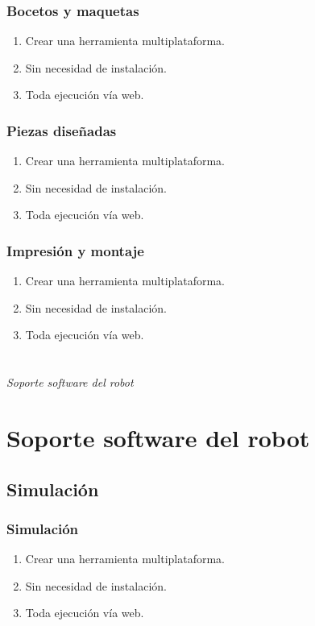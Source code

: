 \documentclass{beamer}
\begin{document}
\begin{frame}
	\frametitle{Bocetos y maquetas}
	\begin{enumerate}
		\item Crear una herramienta multiplataforma.
		\item Sin necesidad de instalación.
		\item Toda ejecución vía web.
	\end{enumerate}
\end{frame}

\begin{frame}
	\frametitle{Piezas diseñadas}
	\begin{enumerate}
		\item Crear una herramienta multiplataforma.
		\item Sin necesidad de instalación.
		\item Toda ejecución vía web.
	\end{enumerate}
\end{frame}

\begin{frame}
	\frametitle{Impresión y montaje}
	\begin{enumerate}
		\item Crear una herramienta multiplataforma.
		\item Sin necesidad de instalación.
		\item Toda ejecución vía web.
	\end{enumerate}
\end{frame}



\section*{}
\begin{frame}{}
	\centering \Huge
	\emph{Soporte software del robot}
\end{frame}

\section{Soporte software del robot}
\subsection{Simulación}
\begin{frame}
	\frametitle{Simulación}
	\begin{enumerate}
		\item Crear una herramienta multiplataforma.
		\item Sin necesidad de instalación.
		\item Toda ejecución vía web.
	\end{enumerate}
\end{frame}
\end{document}
